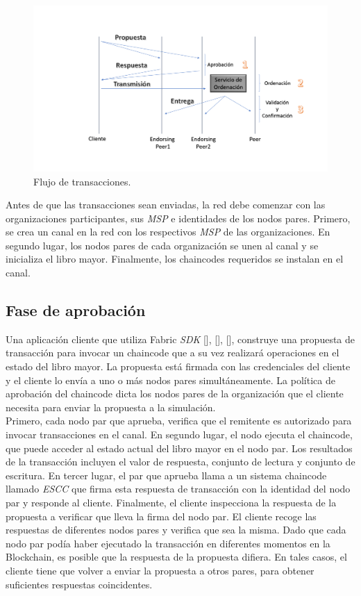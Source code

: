 \begin{figure}[h]
\centering
\includegraphics[width=0.6\linewidth]{Graphics/figura1.png}
\caption{Flujo de transacciones.}
\label{flujo}
\end{figure}

\vspace{1 cm}
Antes de que las transacciones sean enviadas, la red debe comenzar con las organizaciones participantes, sus \emph{MSP} e identidades de los nodos pares. Primero, se crea un canal en la red con los respectivos \emph{MSP} de las organizaciones. En segundo lugar, los nodos pares de cada organizaci\'on se unen al canal y se inicializa el libro mayor. Finalmente, los chaincodes requeridos se instalan en el canal.


\subsection{Fase de aprobaci\'on}
Una aplicaci\'on cliente que utiliza Fabric \emph{SDK} [\cite{Go-SDK}], [\cite{Node-SDK}], [\cite{Java-SDK}], construye una propuesta de transacci\'on para invocar un chaincode que a su vez realizar\'a operaciones en el estado del libro mayor. La propuesta est\'a firmada con las credenciales del cliente y el cliente lo env\'ia a uno o m\'as nodos pares simult\'aneamente. La pol\'itica de aprobaci\'on del chaincode dicta los nodos pares de la organizaci\'on que el cliente necesita para enviar la propuesta a la simulaci\'on.\\ 
Primero, cada nodo par que aprueba, verifica que el remitente es autorizado para invocar transacciones en el canal. En segundo lugar, el nodo ejecuta el chaincode, que puede acceder al estado actual del libro mayor en el nodo par. Los resultados de la transacci\'on incluyen el valor de respuesta, conjunto de lectura y conjunto de escritura. En tercer lugar, el par que aprueba llama a un sistema chaincode llamado \emph{ESCC} que firma esta respuesta de transacci\'on con la identidad del nodo par y responde al cliente. Finalmente, el cliente inspecciona la respuesta de la propuesta a verificar que lleva la firma del nodo par. El cliente recoge las respuestas de diferentes nodos pares y verifica que sea la misma. Dado que cada nodo par pod\'ia haber ejecutado la transacci\'on en diferentes momentos en la Blockchain, es posible que la respuesta de la propuesta difiera. En tales casos, el cliente tiene que volver a enviar la propuesta a otros pares, para obtener suficientes respuestas coincidentes.

